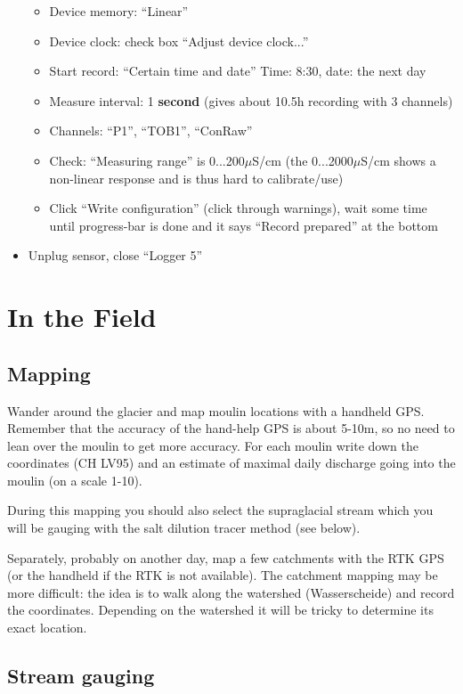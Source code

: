 \documentclass[DIV=15,halfparskip,11pt,headinclude]{scrartcl}
\begin{document}
\begin{itemize}
  \begin{itemize}
  \item Device memory: ``Linear''
  \item Device clock: check box ``Adjust device clock...''
  \item Start record: ``Certain time and date''
    Time: 8:30, date: the next day
\item Measure interval: 1 \textbf{second} (gives about 10.5h recording
  with 3 channels)
\item Channels: ``P1'', ``TOB1'', ``ConRaw''
  \item Check: ``Measuring range'' is 0...200$\mu$S/cm (the
    0...2000$\mu$S/cm shows a non-linear response and is thus hard to
    calibrate/use)
\item Click ``Write configuration'' (click through warnings), wait
  some time until progress-bar is done and it says ``Record prepared'' at the bottom
\end{itemize}

\item Unplug sensor, close ``Logger 5''
\end{itemize}


\section{In the Field}
\subsection{Mapping}
\label{sec-1}

Wander around the glacier and map moulin locations with a handheld
GPS.  Remember that the accuracy of the hand-help GPS is about 5-10m,
so no need to lean over the moulin to get more accuracy.  For each
moulin write down the coordinates (CH LV95) and an estimate of maximal
daily discharge going into the moulin (on a scale 1-10).

During this mapping you should also select the supraglacial stream
which you will be gauging with the salt dilution tracer method (see
below).

Separately, probably on another day, map a few catchments with the
RTK GPS (or the handheld if the RTK is not available).  The
catchment mapping may be more difficult: the idea is to walk along the
watershed (Wasserscheide) and record the coordinates.  Depending on
the watershed it will be tricky to determine its exact location.

\subsection{Stream gauging}
\label{sec-2}
\end{document}
